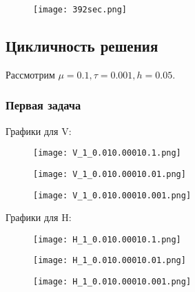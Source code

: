 \documentclass[12pt]{article}
\begin{document}
\begin{figure}[H]
	\centering
	\begin{minipage}{.5\textwidth}
		\centering
		\texttt{[image: 392sec.png]}
	\end{minipage}%
\end{figure}

\subsection{Цикличность решения}
Рассмотрим $\mu = 0.1, \tau = 0.001, h = 0.05.$


\subsubsection{Первая задача}
Графики для V:
\begin{figure}[H]

	\centering
	\begin{minipage}{.5\textwidth}
		\centering
		\texttt{[image: V\_1\_0.010.00010.1.png]}
	\end{minipage}%
	\begin{minipage}{.5\textwidth}
		\centering
		\texttt{[image: V\_1\_0.010.00010.01.png]}
	\end{minipage}
\end{figure}


\begin{figure}[H]
	\centering
	\begin{minipage}{.5\textwidth}
		\centering
		\texttt{[image: V\_1\_0.010.00010.001.png]}
	\end{minipage}%
\end{figure}

Графики для H:
\begin{figure}[H]

	\centering
	\begin{minipage}{.5\textwidth}
		\centering
		\texttt{[image: H\_1\_0.010.00010.1.png]}
	\end{minipage}%
	\begin{minipage}{.5\textwidth}
		\centering
		\texttt{[image: H\_1\_0.010.00010.01.png]}
	\end{minipage}
\end{figure}


\begin{figure}[H]
	\centering
	\begin{minipage}{.5\textwidth}
		\centering
		\texttt{[image: H\_1\_0.010.00010.001.png]}
	\end{minipage}%
\end{figure}
\end{document}
